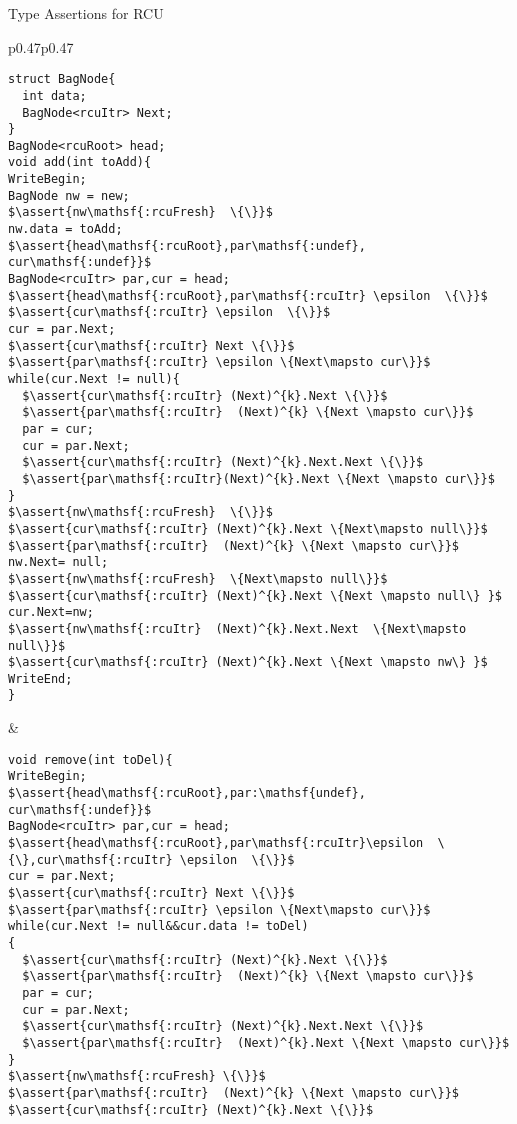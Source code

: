 \documentclass[aspectratio=169,xcolor=dvipsnames]{beamer}
\newcommand{\assert}[1]{\{#1\}}
\begin{document}
\begin{frame}{Type Assertions for RCU}
\begin{figure*}[t!]
\begin{tabular}{p{}p{}}
\begin{lstlisting}[basicstyle=\scriptsize\ttfamily]
struct BagNode{
  int data;
  BagNode<rcuItr> Next;
}
BagNode<rcuRoot> head;
void add(int toAdd){
WriteBegin;
BagNode nw = new;
$\assert{nw\mathsf{:rcuFresh}  \{\}}$
nw.data = toAdd;
$\assert{head\mathsf{:rcuRoot},par\mathsf{:undef}, cur\mathsf{:undef}}$
BagNode<rcuItr> par,cur = head;
$\assert{head\mathsf{:rcuRoot},par\mathsf{:rcuItr} \epsilon  \{\}}$
$\assert{cur\mathsf{:rcuItr} \epsilon  \{\}}$
cur = par.Next;
$\assert{cur\mathsf{:rcuItr} Next \{\}}$
$\assert{par\mathsf{:rcuItr} \epsilon \{Next\mapsto cur\}}$
while(cur.Next != null){
  $\assert{cur\mathsf{:rcuItr} (Next)^{k}.Next \{\}}$
  $\assert{par\mathsf{:rcuItr}  (Next)^{k} \{Next \mapsto cur\}}$
  par = cur;
  cur = par.Next;
  $\assert{cur\mathsf{:rcuItr} (Next)^{k}.Next.Next \{\}}$
  $\assert{par\mathsf{:rcuItr}(Next)^{k}.Next \{Next \mapsto cur\}}$
}
$\assert{nw\mathsf{:rcuFresh}  \{\}}$
$\assert{cur\mathsf{:rcuItr} (Next)^{k}.Next \{Next\mapsto null\}}$
$\assert{par\mathsf{:rcuItr}  (Next)^{k} \{Next \mapsto cur\}}$
nw.Next= null;
$\assert{nw\mathsf{:rcuFresh}  \{Next\mapsto null\}}$
$\assert{cur\mathsf{:rcuItr} (Next)^{k}.Next \{Next \mapsto null\} }$
cur.Next=nw;
$\assert{nw\mathsf{:rcuItr}  (Next)^{k}.Next.Next  \{Next\mapsto null\}}$
$\assert{cur\mathsf{:rcuItr} (Next)^{k}.Next \{Next \mapsto nw\} }$
WriteEnd;
}
\end{lstlisting}&
\begin{lstlisting}[basicstyle=\scriptsize\ttfamily]
void remove(int toDel){
WriteBegin;
$\assert{head\mathsf{:rcuRoot},par:\mathsf{undef}, cur\mathsf{:undef}}$
BagNode<rcuItr> par,cur = head;
$\assert{head\mathsf{:rcuRoot},par\mathsf{:rcuItr}\epsilon  \{\},cur\mathsf{:rcuItr} \epsilon  \{\}}$
cur = par.Next;
$\assert{cur\mathsf{:rcuItr} Next \{\}}$
$\assert{par\mathsf{:rcuItr} \epsilon \{Next\mapsto cur\}}$
while(cur.Next != null&&cur.data != toDel)
{
  $\assert{cur\mathsf{:rcuItr} (Next)^{k}.Next \{\}}$
  $\assert{par\mathsf{:rcuItr}  (Next)^{k} \{Next \mapsto cur\}}$
  par = cur;
  cur = par.Next;
  $\assert{cur\mathsf{:rcuItr} (Next)^{k}.Next.Next \{\}}$
  $\assert{par\mathsf{:rcuItr}  (Next)^{k}.Next \{Next \mapsto cur\}}$
}
$\assert{nw\mathsf{:rcuFresh} \{\}}$
$\assert{par\mathsf{:rcuItr}  (Next)^{k} \{Next \mapsto cur\}}$
$\assert{cur\mathsf{:rcuItr} (Next)^{k}.Next \{\}}$

\end{lstlisting}
\end{tabular}
\end{figure*}
\end{frame}
\end{document}
